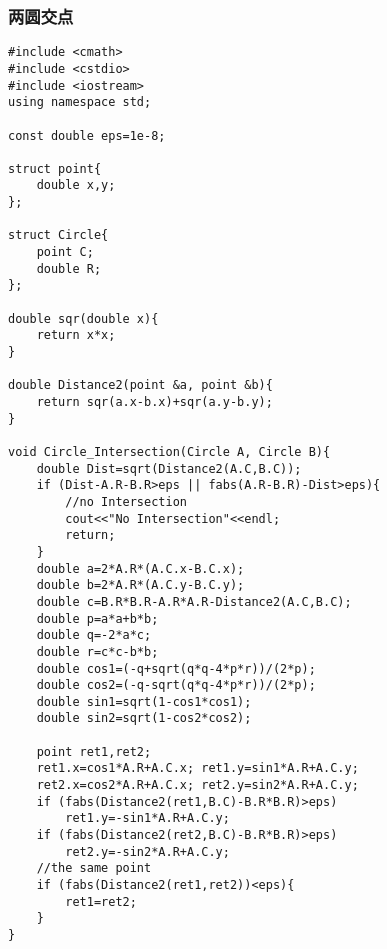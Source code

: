 \subsubsection{两圆交点} 
\begin{verbatim}
#include <cmath>
#include <cstdio>
#include <iostream>
using namespace std;

const double eps=1e-8;

struct point{
    double x,y;
};

struct Circle{
    point C;
    double R;
};

double sqr(double x){
    return x*x;
}

double Distance2(point &a, point &b){
    return sqr(a.x-b.x)+sqr(a.y-b.y);
}

void Circle_Intersection(Circle A, Circle B){
    double Dist=sqrt(Distance2(A.C,B.C));
    if (Dist-A.R-B.R>eps || fabs(A.R-B.R)-Dist>eps){
        //no Intersection
        cout<<"No Intersection"<<endl;
        return;
    }
    double a=2*A.R*(A.C.x-B.C.x);
    double b=2*A.R*(A.C.y-B.C.y);
    double c=B.R*B.R-A.R*A.R-Distance2(A.C,B.C);
    double p=a*a+b*b;
    double q=-2*a*c;
    double r=c*c-b*b;
    double cos1=(-q+sqrt(q*q-4*p*r))/(2*p);
    double cos2=(-q-sqrt(q*q-4*p*r))/(2*p);
    double sin1=sqrt(1-cos1*cos1);
    double sin2=sqrt(1-cos2*cos2);

    point ret1,ret2;
    ret1.x=cos1*A.R+A.C.x; ret1.y=sin1*A.R+A.C.y;
    ret2.x=cos2*A.R+A.C.x; ret2.y=sin2*A.R+A.C.y;
    if (fabs(Distance2(ret1,B.C)-B.R*B.R)>eps)
        ret1.y=-sin1*A.R+A.C.y;
    if (fabs(Distance2(ret2,B.C)-B.R*B.R)>eps)
        ret2.y=-sin2*A.R+A.C.y;
    //the same point
    if (fabs(Distance2(ret1,ret2))<eps){
        ret1=ret2;
    }
}
\end{verbatim}


